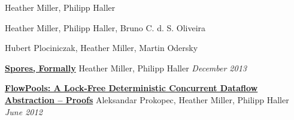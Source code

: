 \documentclass[9pt]{article}
\begin{document}

\dates{}
\newline\noindent Heather Miller, Philipp Haller
\medskip

\dates{}
\newline\noindent Heather Miller, Philipp Haller, Bruno C. d. S. Oliveira
\medskip

\dates{}
\newline\noindent Hubert Plociniczak, Heather Miller, Martin Odersky
\bigskip



\noindent\href{http://infoscience.epfl.ch/record/191240}{\bf Spores, Formally}\dates{}
\newline\noindent Heather Miller, Philipp Haller
\newline\noindent\emph{December 2013}
\medskip

\noindent\href{http://infoscience.epfl.ch/record/181098}{\bf  FlowPools: A Lock-Free Deterministic Concurrent Dataflow Abstraction -- Proofs}\dates{}
\newline\noindent Aleksandar Prokopec, Heather Miller, Philipp Haller
\newline\noindent\emph{June 2012}
\medskip
\end{document}
